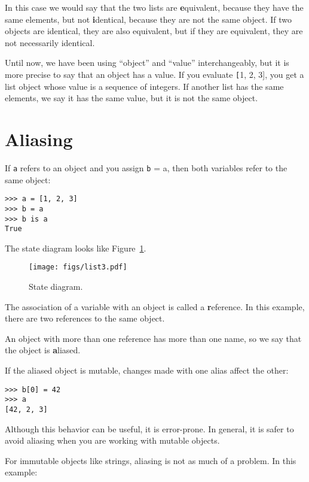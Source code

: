 \documentclass[
DIV=11,
fontsize=13,
twoside,
headinclude=false,
titlepage=firstiscover,
abstract=true,
headsepline=true,
footsepline=true,
chapterprefix=true, %
headings=big,
bibliography=totoc,%
captions=tableheading
]{scrbook}
\theoremstyle{definition}
\begin{document}
In this case we would say that the two lists are {\textbf equivalent},
because they have the same elements, but not {\textbf identical}, because
they are not the same object.  If two objects are identical, they are
also equivalent, but if they are equivalent, they are not necessarily
identical.

Until now, we have been using ``object'' and ``value''
interchangeably, but it is more precise to say that an object has a
value.  If you evaluate {\texttt [1, 2, 3]}, you get a list
object whose value is a sequence of integers.  If another
list has the same elements, we say it has the same value, but
it is not the same object.


\section{Aliasing}

If {\texttt a} refers to an object and you assign {\texttt b = a},
then both variables refer to the same object:

\begin{lstlisting}
>>> a = [1, 2, 3]
>>> b = a
>>> b is a
True
\end{lstlisting}
%
The state diagram looks like Figure~\ref{fig.list3}.

\begin{figure}
\centerline
{\texttt{[image: figs/list3.pdf]}}
\caption{State diagram.}
\label{fig.list3}
\end{figure}

The association of a variable with an object is called a {\textbf
reference}.  In this example, there are two references to the same
object.

An object with more than one reference has more
than one name, so we say that the object is {\textbf aliased}.

If the aliased object is mutable, changes made with one alias affect
the other:

\begin{lstlisting}
>>> b[0] = 42
>>> a
[42, 2, 3]
\end{lstlisting}
%
Although this behavior can be useful, it is error-prone.  In general,
it is safer to avoid aliasing when you are working with mutable
objects.

For immutable objects like strings, aliasing is not as much of a
problem.  In this example:
\end{document}
